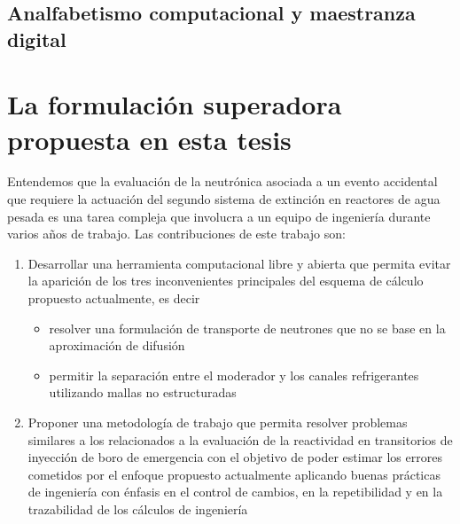 \subsection{Analfabetismo computacional y maestranza digital} %

\lipsum[2]

\section{La formulación superadora propuesta en esta tesis} %
\label{sec:thesolution}


Entendemos que la evaluación de la neutrónica asociada a un evento accidental que requiere la actuación del segundo sistema de extinción en reactores de agua pesada es una tarea compleja que involucra a un equipo de ingeniería durante varios años de trabajo. Las contribuciones de este trabajo son:

\begin{enumerate}
 \item Desarrollar una herramienta computacional libre y abierta que permita evitar la aparición de los tres inconvenientes principales del esquema de cálculo propuesto actualmente, es decir
 \begin{itemize}
  \item resolver una formulación de transporte de neutrones que no se base en la aproximación de difusión
  \item permitir la separación entre el moderador y los canales refrigerantes utilizando mallas no estructuradas
 \end{itemize}
 \item Proponer una metodología de trabajo que permita resolver problemas similares a los relacionados a la evaluación de la reactividad en transitorios de inyección de boro de emergencia con el objetivo de poder estimar los errores cometidos por el enfoque propuesto actualmente aplicando buenas prácticas de ingeniería con énfasis en el control de cambios, en la repetibilidad y en la trazabilidad de los cálculos de ingeniería
\end{enumerate}


